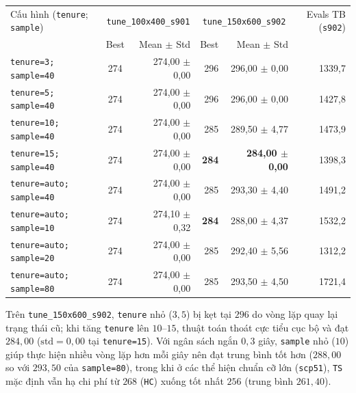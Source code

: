 \begin{center}
\small
\begin{tabular}{lcrrrr}
\toprule
Cấu hình (\texttt{tenure}; \texttt{sample}) & \multicolumn{2}{c}{\texttt{tune\_100x400\_s901}} & \multicolumn{2}{c}{\texttt{tune\_150x600\_s902}} & Evals TB (\texttt{s902}) \\
 & Best & Mean $\pm$ Std & Best & Mean $\pm$ Std & \\
\midrule
\texttt{tenure=3; sample=40}    & 274 & 274,00 $\pm$ 0,00 & 296 & 296,00 $\pm$ 0,00 & 1339,7 \\
\texttt{tenure=5; sample=40}    & 274 & 274,00 $\pm$ 0,00 & 296 & 296,00 $\pm$ 0,00 & 1427,8 \\
\texttt{tenure=10; sample=40}   & 274 & 274,00 $\pm$ 0,00 & 285 & 289,50 $\pm$ 4,77 & 1473,9 \\
\texttt{tenure=15; sample=40}   & 274 & 274,00 $\pm$ 0,00 & \textbf{284} & \textbf{284,00 $\pm$ 0,00} & 1398,3 \\
\texttt{tenure=auto; sample=40} & 274 & 274,00 $\pm$ 0,00 & 285 & 293,30 $\pm$ 4,40 & 1491,2 \\
\texttt{tenure=auto; sample=10} & 274 & 274,10 $\pm$ 0,32 & \textbf{284} & 288,00 $\pm$ 4,37 & 1532,2 \\
\texttt{tenure=auto; sample=20} & 274 & 274,00 $\pm$ 0,00 & 285 & 292,40 $\pm$ 5,56 & 1312,2 \\
\texttt{tenure=auto; sample=80} & 274 & 274,00 $\pm$ 0,00 & 285 & 293,50 $\pm$ 4,50 & 1721,4 \\
\bottomrule
\end{tabular}
\end{center}
Trên \texttt{tune\_150x600\_s902}, \texttt{tenure} nhỏ ($3, 5$) bị kẹt tại $296$ do vòng lặp quay lại trạng thái cũ; khi tăng \texttt{tenure} lên $10$--$15$, thuật toán thoát cực tiểu cục bộ và đạt $284{,}00$ ($\mathrm{std}=0{,}00$ tại \texttt{tenure=15}). Với ngân sách ngắn $0{,}3$ giây, \texttt{sample} nhỏ ($10$) giúp thực hiện nhiều vòng lặp hơn mỗi giây nên đạt trung bình tốt hơn ($288{,}00$ so với $293{,}50$ của \texttt{sample=80}), trong khi ở các thể hiện chuẩn cỡ lớn (\texttt{scp51}), \texttt{TS} mặc định vẫn hạ chi phí từ $268$ (\texttt{HC}) xuống tốt nhất $256$ (trung bình $261{,}40$).
